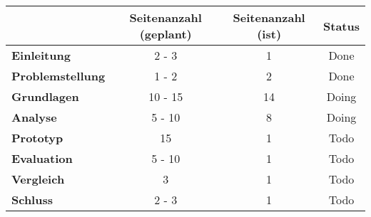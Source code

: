 \begin{table}[H]
\centering
\begin{tabular}{l|c|c|c}
                               & \textbf{Seitenanzahl (geplant)} & \textbf{Seitenanzahl (ist)} & \textbf{Status}              \\ \hline
\textbf{Einleitung} & 2 - 3                           & {\color[HTML]{F8FF00} 1}    & {\color[HTML]{34FF34} Done}  \\ \hline
\textbf{Problemstellung}       & 1 - 2                           & {\color[HTML]{34FF34} 2}    & {\color[HTML]{34FF34} Done}  \\ \hline
\textbf{Grundlagen}            & 10 - 15                         & {\color[HTML]{F8FF00} 14}   & {\color[HTML]{F8FF00} Doing} \\ \hline
\textbf{Analyse}               & 5 - 10                          & {\color[HTML]{F8FF00} 8}    & {\color[HTML]{F8FF00} Doing} \\ \hline
\textbf{Prototyp}              & 15                              & {\color[HTML]{FE0000} 1}    & {\color[HTML]{FE0000} Todo}  \\ \hline
\textbf{Evaluation}            & 5 - 10                          & {\color[HTML]{FE0000} 1}    & {\color[HTML]{FE0000} Todo}  \\ \hline
\textbf{Vergleich}             & 3                               & {\color[HTML]{FE0000} 1}    & {\color[HTML]{FE0000} Todo}  \\ \hline
\textbf{Schluss}               & 2 - 3                           & {\color[HTML]{FE0000} 1}    & {\color[HTML]{FE0000} Todo}  \\
\end{tabular}
\end{table}